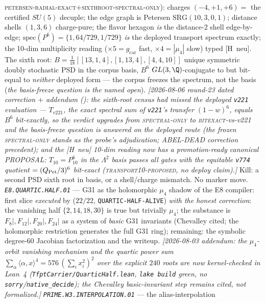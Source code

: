 \documentclass[11pt,a4paper]{article}
\newcommand{\gcar}{g_{\mathrm{car}}}
\begin{document}
\textsc{petersen-radial-exact}$+$\textsc{sixthroot-spectral-only}):
charges $(-4,+1,+6)=$ the certified $SU(5)$ decuple; the edge
graph is Petersen $\mathrm{SRG}(10,3,0,1)$; distance shells
$(1,3,6)$ charge-pure; the flavor hexagon \emph{is} the distance-2
shell edge-by-edge; $\mathrm{spec}(P^6)=\{1,64/729,1/729\}$
\emph{is} the deployed transport spectrum exactly; the 10-dim
multiplicity reading ($\times5=\gcar$ fast, $\times4=|\mu_4|$
slow) typed [H~neu].  The sixth root:
$B=\tfrac1{18}[[13,1,4],[1,13,4],[4,4,10]]$ unique symmetric
doubly stochastic PSD in the corpus basis, $B^6$
$GL(3,\Q)$-conjugate to but bit-equal to \emph{neither} deployed
form --- the corpus freezes the spectrum, not the basis
(\emph{the basis-freeze question is the named open}).
\emph{[2026-08-06 round-23 dated correction $+$ addendum
(): the sixth-root census
had missed the deployed \texttt{v221} evaluation --- $T_{v221}$,
the exact spectral sum of \texttt{v221}'s transfer $(1-w)^6$,
equals $B^6$ \emph{bit-exactly}, so the verdict upgrades from
\textsc{spectral-only} to \textsc{bitexact}-vs-v221 and the
basis-freeze question is \emph{answered} on the deployed route
(the frozen \textsc{spectral-only} stands as the probe's
adjudication; ABEL-DEAD correction precedent); and the [H~neu]
10-dim reading now has a promotion-ready canonical PROPOSAL:
$T_{10}=P_{10}^6$ in the $\Lambda^2$ basis passes all gates with
the equitable \texttt{v774} quotient $=(Q_{\rm Pet}/3)^6$
bit-exact (\textsc{transport10-proposed}, no deploy claim).]}
Kill: a
second PSD sixth root in basis, or a shell/charge mismatch.  No
marker move.
\emph{\texttt{E8.QUARTIC.HALF.01}} --- G31 as the holomorphic $\mu_4$
shadow of the E8 compiler: first slice \emph{executed} by
 ($22/22$, \texttt{QUARTIC-HALF-ALIVE})
\emph{with the honest correction}: the vanishing half
$\{2,14,18,30\}$ is true but trivially $\mu_4$; the substance is
$F_8|,F_{12}|,F_{20}|,F_{24}|$ as a system of \emph{basic} G31
invariants (Chevalley cited; the holomorphic restriction generates
the full G31 ring); remaining: the symbolic degree-60 Jacobian
factorization and the writeup.  \emph{[2026-08-03 addendum: the
$\mu_4$-orbit vanishing mechanism and the quartic power sum
$\sum_\alpha\langle\alpha,x\rangle^4=576\,(\sum_ix_i^2)^2$ over the
explicit $240$ roots are now kernel-checked in Lean~4
(\texttt{TfptCarrier/QuarticHalf.lean}, \texttt{lake build} green, no
\texttt{sorry}/\texttt{native\_decide}); the Chevalley
basic-invariant step remains cited, not formalized.]}
\emph{\texttt{PRIME.W3.INTERPOLATION.01}} --- the alias-interpolation
\end{document}

